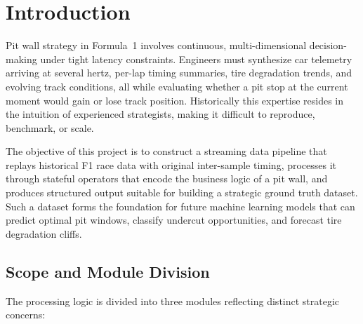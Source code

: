 \documentclass[a4paper,twocolumn]{article}
\begin{document}
\section{Introduction}

Pit wall strategy in Formula~1 involves continuous, multi-dimensional
decision-making under tight latency constraints. Engineers must synthesize
car telemetry arriving at several hertz, per-lap timing summaries, tire
degradation trends, and evolving track conditions, all while evaluating
whether a pit stop at the current moment would gain or lose track position.
Historically this expertise resides in the intuition of experienced
strategists, making it difficult to reproduce, benchmark, or scale.

The objective of this project is to construct a streaming data pipeline
that replays historical F1 race data with original inter-sample timing,
processes it through stateful operators that encode the business logic of a
pit wall, and produces structured output suitable for building a strategic
ground truth dataset. Such a dataset forms the foundation for future
machine learning models that can predict optimal pit windows, classify
undercut opportunities, and forecast tire degradation cliffs.

\subsection{Scope and Module Division}

The processing logic is divided into three modules reflecting distinct
strategic concerns:
\end{document}
